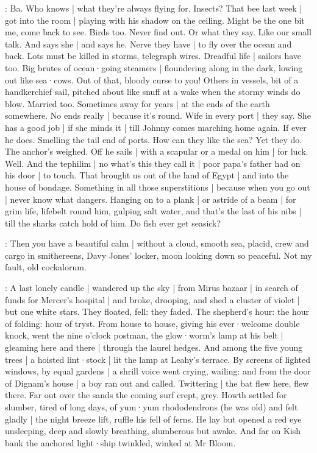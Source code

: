 \Bloom:
Ba.
Who knows |
what they're always flying for.
Insects?
That bee last week |
got into the room |
playing with his shadow
on the ceiling.
Might be the one bit me,
come back to see.
Birds too.
Never find out.
Or what they say.
Like our small talk.
And says she |
and says he.
Nerve they have |
to fly over the ocean
and back.
Lots must be killed in storms,
telegraph wires.
Dreadful life |
sailors have too.
Big brutes of ocean·going steamers |
floundering along in the dark,
lowing out like sea·cows.
Out of that,
bloody curse to you!%
Others in vessels,
bit of a handkerchief sail,
pitched about like snuff at a wake
when the stormy winds do blow.
Married too.
Sometimes away for years |
at the ends of the earth somewhere.
No ends really |
because it's round.
Wife in every port |
they say.
She has a good job |
if she minds it |
till Johnny comes marching home again.
If ever he does.
Smelling the tail end of ports.
How can they like the sea?
Yet they do.
The anchor's weighed.
Off he sails |
with a scapular or a medal on him |
for luck.
Well.
And the tephilim |
no what's this they call it |
poor papa's father had on his door |
to touch.
That brought us out of the land of Egypt |
and into the house of bondage.
Something in all those superstitions |
because when you go out |
never know what dangers.%
Hanging on to a plank |
or astride of a beam |
for grim life,
lifebelt round him,
gulping salt water,
and that's the last of his nibs |
till the sharks catch hold of him.
Do fish ever get seasick?

\Bloom:
Then you have a beautiful calm |
without a cloud,
smooth sea,
placid,
crew and cargo in smithereens,
Davy Jones' locker,
moon looking down so peaceful.
Not my fault,
old cockalorum.

:
A last lonely candle |
wandered up the sky |
from Mirus bazaar |
in search of funds for Mercer's hospital |
and broke,
drooping,
and shed a cluster of violet |
but one white stars.
They floated,
fell:
they faded.
The shepherd's hour:
the hour of folding:
hour of tryst.
From house to house,
giving his ever·welcome double knock,%
went the nine o'clock postman,
the glow·worm's lamp at his belt |
gleaming here and there |
through the laurel hedges.
And among the five young trees |
a hoisted lint·stock |
lit the lamp at Leahy's terrace.
By screens of lighted windows,
by equal gardens |
a shrill voice went crying,
wailing:
and from the door of Dignam's house |
a boy ran out and called.
Twittering |
the bat flew here,
flew there.
Far out over the sands
the coming surf crept,
grey.
Howth settled for slumber,
tired of long days,
of yum·yum rhododendrons
(he was old)
and felt gladly |
the night breeze lift,
ruffle his fell of ferns.
He lay
but opened a red eye
unsleeping,
deep and slowly breathing,
slumberous but awake.%
And far on Kish bank
the anchored light·ship twinkled,
winked at Mr Bloom.

